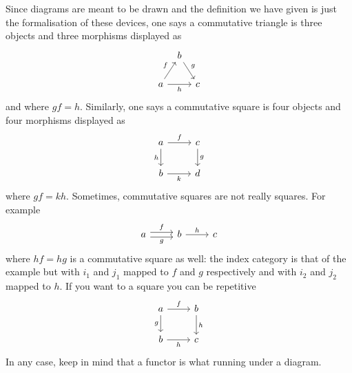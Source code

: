 Since diagrams are meant to be drawn and the definition we have given
is just the formalisation of these devices, one says a commutative
triangle is three objects and three morphisms displayed as
\[
  \begin{tikzcd}[column sep=tiny]
    & b \ar["g", dr]  \\
    a \ar["f", ur] \ar["h", rr, swap] & & c
  \end{tikzcd}
\]
and where \(gf = h\). Similarly, one says a commutative square is four
objects and four morphisms displayed as
\[
  \begin{tikzcd}
    a \ar["f", r] \ar["h", d, swap] & c \ar["g", d] \\
    b \ar["k", r, swap] & d
  \end{tikzcd}
\]
where \(gf = kh\). Sometimes, commutative squares are not really
squares. For example
\[
  \begin{tikzcd}
    a \ar["f", r, shift left] \ar["g", r, shift right, swap] & b
    \ar["h", r] & c
  \end{tikzcd}
\]
where \(hf = hg\) is a commutative square as well: the index category is that of the example but
with \(i_1\) and \(j_1\) mapped to \(f\) and \(g\) respectively and
with \(i_2\) and \(j_2\) mapped to \(h\). If you want to a square you
can be repetitive
\[
  \begin{tikzcd}
    a \ar["f", r] \ar["g", d, swap] & b \ar["h", d] \\
    b \ar["h", r, swap] & c
  \end{tikzcd}
\]
In any case, keep in mind that a functor is what running under a diagram.

